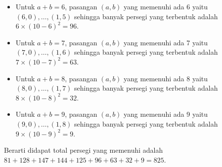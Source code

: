 \documentclass[12pt]{scrartcl}
\begin{document}
\begin{solusi}
\begin{itemize}
 \item Untuk $a+b=6$, pasangan $(a,b)$ yang memenuhi ada 6 yaitu $(6,0),\dots,(1,5)$ sehingga banyak persegi yang terbentuk adalah $6 \times (10-6)^2 = 96$.
 \item Untuk $a+b=7$, pasangan $(a,b)$ yang memenuhi ada 7 yaitu $(7,0),\dots,(1,6)$ sehingga banyak persegi yang terbentuk adalah $7 \times (10-7)^2 = 63$.
 \item Untuk $a+b=8$, pasangan $(a,b)$ yang memenuhi ada 8 yaitu $(8,0),\dots,(1,7)$ sehingga banyak persegi yang terbentuk adalah $8 \times (10-8)^2 = 32$.
 \item Untuk $a+b=9$, pasangan $(a,b)$ yang memenuhi ada 9 yaitu $(9,0),\dots,(1,8)$ sehingga banyak persegi yang terbentuk adalah $9 \times (10-9)^2 = 9$.
 \end{itemize}
 Berarti didapat total persegi yang memenuhi adalah $81+128+147+144+125+96+63+32+9=\boxed{825}$.
\end{solusi}
\end{document}
